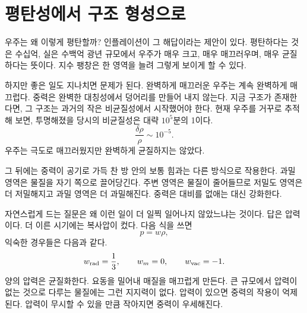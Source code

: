 \begin{classroomqa}
\end{classroomqa}

\begin{classroomqa}
\end{classroomqa}

\section{평탄성에서 구조 형성으로}

우주는 왜 이렇게 평탄할까? 인플레이션이 그 해답이라는 제안이 있다. 평탄하다는 것은 수십억, 실은 수백억 광년 규모에서 우주가 매우 크고, 매우 매끄러우며, 매우 균질하다는 뜻이다. 지수 팽창은 한 영역을 늘려 그렇게 보이게 할 수 있다.

하지만 좋은 일도 지나치면 문제가 된다. 완벽하게 매끄러운 우주는 계속 완벽하게 매끄럽다. 중력은 완벽한 대칭성에서 덩어리를 만들어 내지 않는다. 지금 구조가 존재한다면, 그 구조는 과거의 작은 비균질성에서 시작했어야 한다. 현재 우주를 거꾸로 추적해 보면, 투명해졌을 당시의 비균질성은 대략 \(10^5\)분의 1이다.
\begin{equation}
\frac{\delta\rho}{\rho}\sim 10^{-5}.
\end{equation}
우주는 극도로 매끄러웠지만 완벽하게 균질하지는 않았다.

그 뒤에는 중력이 공기로 가득 찬 방 안의 보통 힘과는 다른 방식으로 작용한다. 과밀 영역은 물질을 자기 쪽으로 끌어당긴다. 주변 영역은 물질이 줄어들므로 저밀도 영역은 더 저밀해지고 과밀 영역은 더 과밀해진다. 중력은 대비를 없애는 대신 강화한다.

자연스럽게 드는 질문은 왜 이런 일이 더 일찍 일어나지 않았느냐는 것이다. 답은 압력이다. 더 이른 시기에는 복사압이 컸다. 다음 식을 쓰면
\begin{equation}
p=w\rho,
\end{equation}
익숙한 경우들은 다음과 같다.
\begin{equation}
w_{\rm rad}=\frac13,\qquad
w_m=0,\qquad
w_{\rm vac}=-1.
\end{equation}
양의 압력은 균질화한다. 요동을 밀어내 매질을 매끄럽게 만든다. 큰 규모에서 압력이 없는 것으로 다루는 물질에는 그런 지지력이 없다. 압력이 있으면 중력의 작용이 억제된다. 압력이 무시할 수 있을 만큼 작아지면 중력이 우세해진다.

